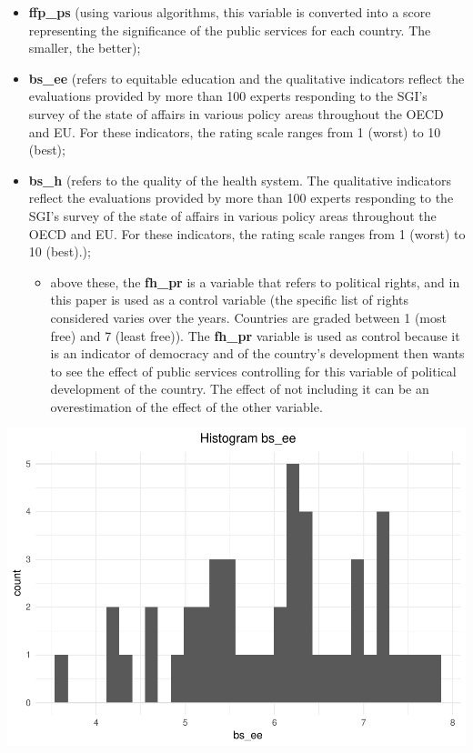 \documentclass[]{elsarticle} %
\makeatletter
\providecommand{\tightlist}{%
  \setlength{\itemsep}{0pt}\setlength{\parskip}{0pt}}
\def\maxwidth{\ifdim\Gin@nat@width>\linewidth\linewidth
\else\Gin@nat@width\fi}
\let\Oldincludegraphics\includegraphics
\renewcommand{\includegraphics}[1]{\Oldincludegraphics[width=\maxwidth]{#1}}
\makeatother
\begin{document}
\begin{itemize}
\tightlist
\item
  \textbf{ffp\_ps} (using various algorithms, this variable is converted
  into a score representing the significance of the public services for
  each country. The smaller, the better);
\item
  \textbf{bs\_ee} (refers to equitable education and the qualitative
  indicators reflect the evaluations provided by more than 100 experts
  responding to the SGI's survey of the state of affairs in various
  policy areas throughout the OECD and EU. For these indicators, the
  rating scale ranges from 1 (worst) to 10 (best);
\item
  \textbf{bs\_h} (refers to the quality of the health system. The
  qualitative indicators reflect the evaluations provided by more than
  100 experts responding to the SGI's survey of the state of affairs in
  various policy areas throughout the OECD and EU. For these indicators,
  the rating scale ranges from 1 (worst) to 10 (best).);

  \begin{itemize}
  \tightlist
  \item
    above these, the \textbf{fh\_pr} is a variable that refers to
    political rights, and in this paper is used as a control variable
    (the specific list of rights considered varies over the years.
    Countries are graded between 1 (most free) and 7 (least free)). The
    \textbf{fh\_pr} variable is used as control because it is an
    indicator of democracy and of the country's development then wants
    to see the effect of public services controlling for this variable
    of political development of the country. The effect of not including
    it can be an overestimation of the effect of the other variable.
  \end{itemize}
\end{itemize}

\includegraphics{refugees-stephanie_files/figure-latex/ggplot_variables1-1.pdf}
\end{document}
